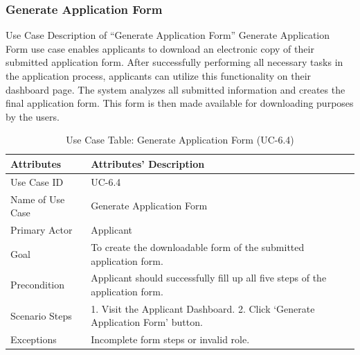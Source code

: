 \subsubsection{Generate Application Form}
Use Case Description of “Generate Application Form”
Generate Application Form use case enables applicants to download an electronic copy of their submitted application form. After successfully performing all necessary tasks in the application process, applicants can utilize this functionality on their dashboard page. The system analyzes all submitted information and creates the final application form. This form is then made available for downloading purposes by the users.
\begin{table}[H]
    \centering
    \small
    \renewcommand{\arraystretch}{1.4}
    \caption{Use Case Table: Generate Application Form (UC-6.4)}
    \label{tab:generate_application_form}
    
    \begin{tabularx}{\textwidth}{|l|X|}
        \hline
        \rowcolor[gray]{0.9} {Attributes} & {Attributes' Description} \\ \hline
        Use Case ID & UC-6.4 \\ \hline
        Name of Use Case & Generate Application Form \\ \hline
        Primary Actor & Applicant \\ \hline
        Goal & To create the downloadable form of the submitted application form. \\ \hline
        Precondition & Applicant should successfully fill up all five steps of the application form. \\ \hline
        Scenario Steps & 1. Visit the Applicant Dashboard. 2. Click ‘Generate Application Form’ button. \\ \hline
        Exceptions & Incomplete form steps or invalid role. \\ \hline
    \end{tabularx}
\end{table}
\FloatBarrier